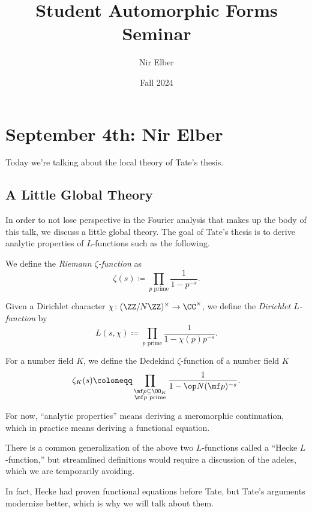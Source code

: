 \documentclass{article}
\title{Student Automorphic Forms Seminar}
\author{Nir Elber}
\date{Fall 2024}
\begin{document}
\maketitle

\tableofcontents

\section{September 4th: Nir Elber}
Today we're talking about the local theory of Tate's thesis.

\subsection{A Little Global Theory}
In order to not lose perspective in the Fourier analysis that makes up the body of this talk, we discuss a little global theory. The goal of Tate's thesis is to derive analytic properties of $L$-functions such as the following.
\begin{definition}
	We define the \textit{Riemann $\zeta$-function} as
	\[\zeta(s)\coloneqq\prod_{p\text{ prime}}\frac1{1-p^{-s}}.\]
\end{definition}
\begin{definition}
	Given a Dirichlet character $\chi\colon(\ZZ/N\ZZ)^\times\to\CC^\times$, we define the \textit{Dirichlet $L$-function} by
	\[L(s,\chi)\coloneqq\prod_{p\text{ prime}}\frac1{1-\chi(p)p^{-s}}.\]
\end{definition}
\begin{definition}
	For a number field $K$, we define the Dedekind $\zeta$-function of a number field $K$
\[\zeta_K(s)\coloneqq\prod_{\substack{\mf p\subseteq\OO_K\\\mf p\text{ prime}}}\frac1{1-\op N(\mf p)^{-s}}.\]
\end{definition}
For now, ``analytic properties'' means deriving a meromorphic continuation, which in practice means deriving a functional equation.
\begin{remark}
	There is a common generalization of the above two $L$-functions called a ``Hecke $L$-function,'' but streamlined definitions would require a discussion of the adeles, which we are temporarily avoiding.
\end{remark}
In fact, Hecke had proven functional equations before Tate, but Tate's arguments modernize better, which is why we will talk about them.
\end{document}
